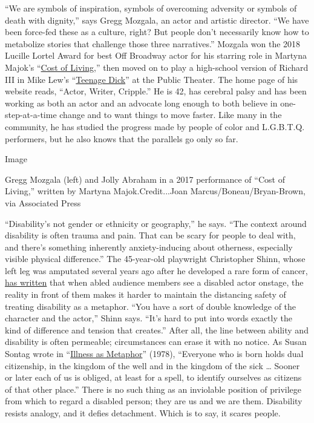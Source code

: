 ``We are symbols of inspiration, symbols of overcoming adversity or
symbols of death with dignity,'' says Gregg Mozgala, an actor and
artistic director. ``We have been force-fed these as a culture, right?
But people don't necessarily know how to metabolize stories that
challenge those three narratives.'' Mozgala won the 2018 Lucille Lortel
Award for best Off Broadway actor for his starring role in Martyna
Majok's
``\href{https://www.nytimes3xbfgragh.onion/2017/06/07/theater/cost-of-living-review.html}{Cost
of Living},'' then moved on to play a high-school version of Richard III
in Mike Lew's
``\href{https://www.nytimes3xbfgragh.onion/2018/06/20/theater/teenage-dick-review.html}{Teenage
Dick}'' at the Public Theater. The home page of his website reads,
``Actor, Writer, Cripple.'' He is 42, has cerebral palsy and has been
working as both an actor and an advocate long enough to both believe in
one-step-at-a-time change and to want things to move faster. Like many
in the community, he has studied the progress made by people of color
and L.G.B.T.Q. performers, but he also knows that the parallels go only
so far.

Image

Gregg Mozgala (left) and Jolly Abraham in a 2017 performance of ``Cost
of Living,'' written by Martyna Majok.Credit...Joan
Marcus/Boneau/Bryan-Brown, via Associated Press

``Disability's not gender or ethnicity or geography,'' he says. ``The
context around disability is often trauma and pain. That can be scary
for people to deal with, and there's something inherently
anxiety-inducing about otherness, especially visible physical
difference.'' The 45-year-old playwright Christopher Shinn, whose left
leg was amputated several years ago after he developed a rare form of
cancer,
\href{https://www.theatlantic.com/entertainment/archive/2014/07/why-disabled-characters-are-never-played-by-disabled-actors/374822/}{has
written} that when abled audience members see a disabled actor onstage,
the reality in front of them makes it harder to maintain the distancing
safety of treating disability as a metaphor. ``You have a sort of double
knowledge of the character and the actor,'' Shinn says. ``It's hard to
put into words exactly the kind of difference and tension that
creates.'' After all, the line between ability and disability is often
permeable; circumstances can erase it with no notice. As Susan Sontag
wrote in
``\href{https://www.nytimes3xbfgragh.onion/2005/12/04/magazine/illness-as-more-than-metaphor.html}{Illness
as Metaphor}'' (1978), ``Everyone who is born holds dual citizenship, in
the kingdom of the well and in the kingdom of the sick \ldots{} Sooner
or later each of us is obliged, at least for a spell, to identify
ourselves as citizens of that other place.'' There is no such thing as
an inviolable position of privilege from which to regard a disabled
person; they are us and we are them. Disability resists analogy, and it
defies detachment. Which is to say, it scares people.


